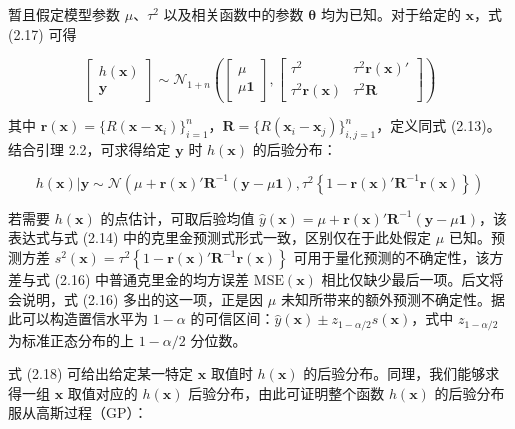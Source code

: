 \documentclass{ctexart}
\begin{document}
暂且假定模型参数 $\mu$、$\tau^2$ 以及相关函数中的参数 $\boldsymbol{\theta}$ 均为已知。对于给定的 $\boldsymbol{x}$，式 (2.17) 可得

\begin{equation*}
\begin{bmatrix}
h(\boldsymbol{x})\\\boldsymbol{y}
\end{bmatrix}\sim\mathcal{N}_{1+n}\left(
\begin{bmatrix}\mu\\\mu\boldsymbol{1}\end{bmatrix},
\begin{bmatrix}
\tau^2&\tau^2\boldsymbol{r}(\boldsymbol{x})'\\
\tau^2\boldsymbol{r}(\boldsymbol{x})&\tau^2\boldsymbol{R}
\end{bmatrix}
\right)
\end{equation*}

其中 $\boldsymbol{r}(\boldsymbol{x})=\{R(\boldsymbol{x}-\boldsymbol{x}_i)\}_{i=1}^n$，$\boldsymbol{R}=\{R(\boldsymbol{x}_i-\boldsymbol{x}_j)\}_{i,j=1}^n$，定义同式 (2.13)。结合引理 2.2，可求得给定 $\boldsymbol{y}$ 时 $h(\boldsymbol{x})$ 的后验分布：

\begin{equation*}
h(\boldsymbol{x})|\boldsymbol{y}\sim\mathcal{N}\left(\mu+\boldsymbol{r}(\boldsymbol{x})'\boldsymbol{R}^{-1}(\boldsymbol{y}-\mu\boldsymbol{1}),\tau^2\left\{1-\boldsymbol{r}(\boldsymbol{x})'\boldsymbol{R}^{-1}\boldsymbol{r}(\boldsymbol{x})\right\}\right)\tag{2.18}
\end{equation*}

若需要 $h(\boldsymbol{x})$ 的点估计，可取后验均值 $\widehat{y}(\boldsymbol{x})=\mu+\boldsymbol{r}(\boldsymbol{x})'\boldsymbol{R}^{-1}(\boldsymbol{y}-\mu\boldsymbol{1})$，该表达式与式 (2.14) 中的克里金预测式形式一致，区别仅在于此处假定 $\mu$ 已知。预测方差 $s^2(\boldsymbol{x})=\tau^2\left\{1-\boldsymbol{r}(\boldsymbol{x})'\boldsymbol{R}^{-1}\boldsymbol{r}(\boldsymbol{x})\right\}$ 可用于量化预测的不确定性，该方差与式 (2.16) 中普通克里金的均方误差 $\mathrm{MSE}(\boldsymbol{x})$ 相比仅缺少最后一项。后文将会说明，式 (2.16) 多出的这一项，正是因 $\mu$ 未知所带来的额外预测不确定性。据此可以构造置信水平为 $1-\alpha$ 的可信区间：$\widehat{y}(\boldsymbol{x})\pm z_{1-\alpha/2}s(\boldsymbol{x})$，式中 $z_{1-\alpha/2}$ 为标准正态分布的上 $1-\alpha/2$ 分位数。

式 (2.18) 可给出给定某一特定 $\boldsymbol{x}$ 取值时 $h(\boldsymbol{x})$ 的后验分布。同理，我们能够求得一组 $\boldsymbol{x}$ 取值对应的 $h(\boldsymbol{x})$ 后验分布，由此可证明整个函数 $h(\boldsymbol{x})$ 的后验分布服从高斯过程（GP）：
\end{document}
